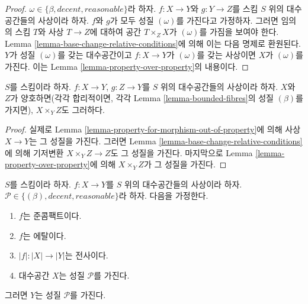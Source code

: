 \begin{proof}
$\omega \in \{\beta, decent, reasonable\}$라 하자.
$f : X \to Y$와 $g : Y \to Z$를 스킴 $S$ 위의 대수공간들의 사상이라
하자. $f$와 $g$가 모두 성질 $(\omega)$를 가진다고 가정하자. 그러면
임의의 스킴 $T$와 사상 $T \to Z$에 대하여 공간 $T \times_Z X$가
$(\omega)$를 가짐을 보여야 한다. Lemma
\ref{lemma-base-change-relative-conditions}에 의해 이는 다음 명제로
환원된다. $Y$가 성질 $(\omega)$를 갖는 대수공간이고
$f : X \to Y$가 $(\omega)$를 갖는 사상이면 $X$가 $(\omega)$를
가진다. 이는 Lemma \ref{lemma-property-over-property}의 내용이다.
\end{proof}

\begin{lemma}
\label{lemma-fibre-product-conditions}
$S$를 스킴이라 하자. $f : X \to Y$, $g : Z \to Y$를 $S$ 위의
대수공간들의 사상이라 하자. $X$와 $Z$가 양호하면(각각 합리적이면,
각각 Lemma \ref{lemma-bounded-fibres}의 성질 $(\beta)$를 가지면),
$X \times_Y Z$도 그러하다.
\end{lemma}

\begin{proof}
실제로 Lemma \ref{lemma-property-for-morphism-out-of-property}에 의해
사상 $X \to Y$는 그 성질을 가진다. 그러면 Lemma
\ref{lemma-base-change-relative-conditions}에 의해 기저변환
$X \times_Y Z \to Z$도 그 성질을 가진다. 마지막으로 Lemma
\ref{lemma-property-over-property}에 의해 $X \times_Y Z$가 그 성질을
가진다.
\end{proof}

\begin{lemma}
\label{lemma-descent-conditions}
$S$를 스킴이라 하자.
$f : X \to Y$를 $S$ 위의 대수공간들의 사상이라 하자.
$\mathcal{P} \in \{(\beta), decent, reasonable\}$라 하자.
다음을 가정한다.
\begin{enumerate}
\item $f$는 준콤팩트이다.
\item $f$는 에탈이다.
\item $|f| : |X| \to |Y|$는 전사이다.
\item 대수공간 $X$는 성질 $\mathcal{P}$를 가진다.
\end{enumerate}
그러면 $Y$는 성질 $\mathcal{P}$를 가진다.
\end{lemma}

